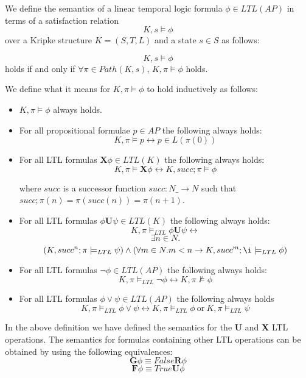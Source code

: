 \begin{mydef}
We define the semantics of a linear temporal logic formula $\phi \in LTL(AP)$ in terms of a satisfaction relation $$K,s \models \phi$$ over a Kripke structure $K = (S,T,L)$ and a state $s \in S$ as follows:

$$K,s \models \phi$$ holds if and only if $\forall \pi \in Path(K, s)$, $K,\pi \models \phi$ holds.

We define what it means for $K, \pi \models \phi$ to hold inductively as follows:

\begin{itemize} 
\item $K,\pi \models \phi$ always holds.

\item For all propositional formulae $p \in AP$ the following always holds:
     $$K,\pi \models p \leftrightarrow p \in L(\pi(0))$$

\item For all LTL formulas $\mathbf{X} \phi \in LTL(K)$ the following always holds:
$$ K, \pi \models \mathbf{X} \phi \leftrightarrow K, succ;\pi \models \phi $$

where $succ$ is a successor function $succ: N \_ \to N$ such that $succ;\pi(n) = \pi(succ(n)) = \pi(n + 1)$.

\item For all LTL formulas $\phi \mathbf{U} \psi \in LTL(K)$ the following always holds:
$$K, \pi \models_{LTL} \phi \mathbf{U} \psi \leftrightarrow$$
$$\exists n \in N.$$
$$(K,succ^n; \pi \models_{LTL} \psi) \wedge (\forall m \in N. m < n \to K, succ^m;\i \models_{LTL} \phi)$$

\item For all LTL formulas $\neg \phi \in LTL(AP)$ the following always holds:
$$K,\pi \models_{LTL} \neg \phi \leftrightarrow K,\pi \not\models \phi $$

\item For all LTL formulas $\phi \vee \psi \in LTL(AP)$ the following always holds
$$K,\pi \models_{LTL} \phi \vee \psi \leftrightarrow K,\pi \models_{LTL} \phi \ \mathrm{or} \ K,\pi \models_{LTL} \psi $$

\end{itemize}

\end{mydef}
In the above definition we have defined the semantics for the \textbf{U} and \textbf{X} LTL operations. 
The semantics for formulas containing other LTL operations can be obtained by using the following equivalences:
$$\textbf{G} \phi \equiv False \mathbf{R} \phi $$
$$\textbf{F} \phi \equiv  True \mathbf{U} \phi$$

